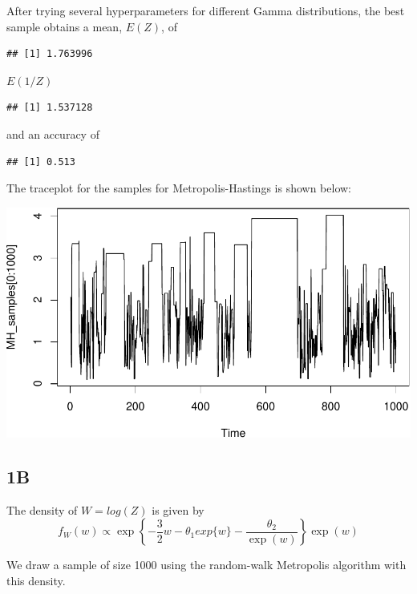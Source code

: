 \documentclass[]{article}
\begin{document}
After trying several hyperparameters for different Gamma distributions,
the best sample obtains a mean, \(E(Z)\), of

\begin{verbatim}
## [1] 1.763996
\end{verbatim}

\(E(1/Z)\)

\begin{verbatim}
## [1] 1.537128
\end{verbatim}

and an accuracy of

\begin{verbatim}
## [1] 0.513
\end{verbatim}

The traceplot for the samples for Metropolis-Hastings is shown below:

\includegraphics{AMS206b_H4_files/figure-latex/unnamed-chunk-5-1.pdf}

\subsection{1B}\label{b}

The density of \(W = log(Z)\) is given by
\[ f_W(w) \propto \exp\left\{- \frac{3}{2} w - \theta_1 exp\{w\} - \frac{\theta_2}{\exp(w)} \right\} \exp(w) \]

We draw a sample of size 1000 using the random-walk Metropolis algorithm
with this density.
\end{document}
